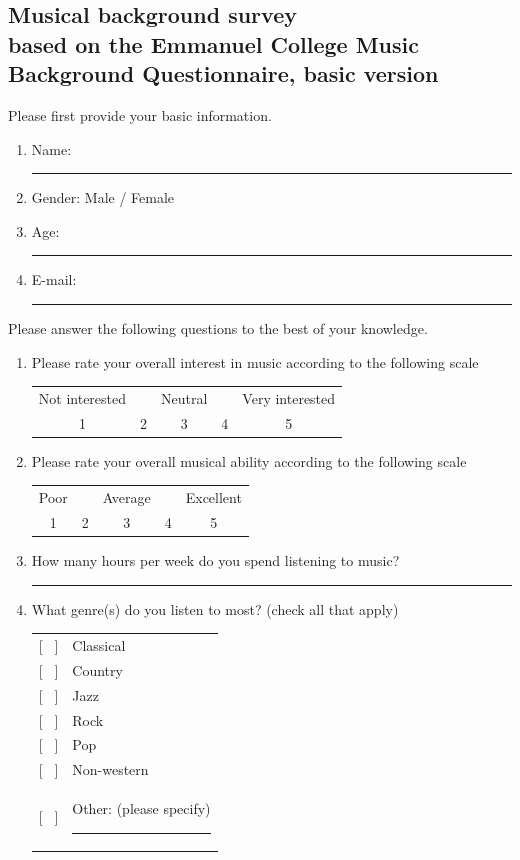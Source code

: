 \documentclass[a4paper,11pt]{article}
\newcommand{\myunderline}{\rule{2in}{.5pt}}
\begin{document}
\begin{appendices}

\section[Musical background survey]{Musical background survey\\
	{\normalsize based on the Emmanuel College Music Background Questionnaire, basic version}}

Please first provide your basic information.

\begin{enumerate}
	\item Name: \myunderline
	\item Gender: Male / Female
	\item Age: \myunderline
	\item E-mail: \myunderline
\end{enumerate}
Please answer the following questions to the best of your knowledge.
\begin{enumerate}[resume]

	\item Please rate your overall interest in music according to the following scale

	\begin{tabular}{c c c c c}
		Not interested & & Neutral & & Very interested \\
		1 & 2 & 3 & 4 & 5 \\
	\end{tabular}

	\item Please rate your overall musical ability according to the following scale

	\begin{tabular}{c c c c c}
		Poor & & Average & & Excellent \\
		1 & 2 & 3 & 4 & 5 \\
	\end{tabular}

	\item How many hours per week do you spend listening to music?

	\myunderline

	\item What genre(s) do you listen to most? (check all that apply)

	\begin{tabular}{l l}
		{[{ \ }]} & Classical \\
		{[{ \ }]} & Country \\
		{[{ \ }]} & Jazz \\
		{[{ \ }]} & Rock \\
		{[{ \ }]} & Pop \\
		{[{ \ }]} & Non-western \\
		{[{ \ }]} & Other: (please specify) \myunderline \\
	\end{tabular}


\end{enumerate}
\end{appendices}
\end{document}
